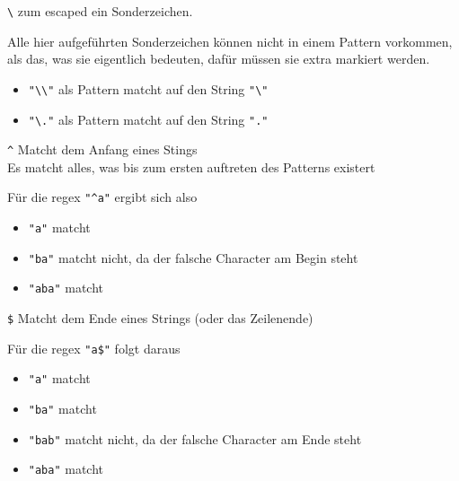 \documentclass[ignorenonframetext,]{beamer}
\providecommand{\tightlist}{%
  \setlength{\itemsep}{0pt}\setlength{\parskip}{0pt}}
\begin{document}
\begin{frame}

\texttt{\textbackslash{}} zum escaped ein Sonderzeichen.

Alle hier aufgeführten Sonderzeichen können nicht in einem Pattern
vorkommen, als das, was sie eigentlich bedeuten, dafür müssen sie extra
markiert werden.

\begin{itemize}
\tightlist
\item
  \texttt{"\textbackslash{}\textbackslash{}"} als Pattern matcht auf den
  String \texttt{"\textbackslash{}"}
\item
  \texttt{"\textbackslash{}."} als Pattern matcht auf den String
  \texttt{"."}
\end{itemize}

\end{frame}

\begin{frame}

\texttt{\^{}} Matcht dem Anfang eines Stings\\
Es matcht alles, was bis zum ersten auftreten des Patterns existert

Für die regex \texttt{"\^{}a"} ergibt sich also

\begin{itemize}
\tightlist
\item
  \texttt{"a"} matcht
\item
  \texttt{"ba"} matcht nicht, da der falsche Character am Begin steht
\item
  \texttt{"aba"} matcht
\end{itemize}

\end{frame}

\begin{frame}

\texttt{\$} Matcht dem Ende eines Strings (oder das Zeilenende)

Für die regex \texttt{"a\$"} folgt daraus

\begin{itemize}
\tightlist
\item
  \texttt{"a"} matcht
\item
  \texttt{"ba"} matcht
\item
  \texttt{"bab"} matcht nicht, da der falsche Character am Ende steht
\item
  \texttt{"aba"} matcht
\end{itemize}

\end{frame}
\end{document}
